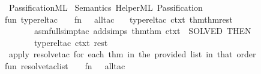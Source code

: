 %
\begin{isabellebody}%
%
%
\isadelimtheory
%
\endisadelimtheory
%
\isatagtheory
{}\isamarkupfalse%
\ PassificationML\isanewline
{}\ Semantics\ HelperML\ Passification\isanewline
{}%
\endisatagtheory
{\isafoldtheory}%
%
\isadelimtheory
\isanewline
%
\endisadelimtheory
\isanewline
%
\isadelimML
\isanewline
%
\endisadelimML
%
\isatagML
{}\isamarkupfalse%
\ {\isacartoucheopen}\isanewline
fun\ type{\isacharunderscore}{\kern0pt}rel{\isacharunderscore}{\kern0pt}tac\ {\isacharunderscore}{\kern0pt}\ {\isacharbrackleft}{\kern0pt}{\isacharbrackright}{\kern0pt}\ {\isacharequal}{\kern0pt}\ {\isacharparenleft}{\kern0pt}fn\ {\isacharunderscore}{\kern0pt}\ {\isacharequal}{\kern0pt}{\isachargreater}{\kern0pt}\ all{\isacharunderscore}{\kern0pt}tac{\isacharparenright}{\kern0pt}\isanewline
\ {\isacharbar}{\kern0pt}\ \ type{\isacharunderscore}{\kern0pt}rel{\isacharunderscore}{\kern0pt}tac\ ctxt\ {\isacharparenleft}{\kern0pt}{\isacharparenleft}{\kern0pt}thm{}{\isacharcomma}{\kern0pt}thm{}{\isacharparenright}{\kern0pt}{\isacharcolon}{\kern0pt}{\isacharcolon}{\kern0pt}rest{\isacharparenright}{\kern0pt}\ {\isacharequal}{\kern0pt}\ \isanewline
\ \ \ \ \ \ \ {\isacharparenleft}{\kern0pt}{\isacharparenleft}{\kern0pt}asm{\isacharunderscore}{\kern0pt}full{\isacharunderscore}{\kern0pt}simp{\isacharunderscore}{\kern0pt}tac\ {\isacharparenleft}{\kern0pt}add{\isacharunderscore}{\kern0pt}simps\ {\isacharbrackleft}{\kern0pt}thm{}{\isacharcomma}{\kern0pt}thm{}{\isacharbrackright}{\kern0pt}\ ctxt{\isacharparenright}{\kern0pt}{\isacharparenright}{\kern0pt}\ {\isacharbar}{\kern0pt}{\isachargreater}{\kern0pt}\ SOLVED{\isacharprime}{\kern0pt}{\isacharparenright}{\kern0pt}\ THEN{\isacharprime}{\kern0pt}\isanewline
\ \ \ \ \ \ \ type{\isacharunderscore}{\kern0pt}rel{\isacharunderscore}{\kern0pt}tac\ ctxt\ rest\isanewline
\isanewline
{\isacharparenleft}{\kern0pt}{\isacharasterisk}{\kern0pt}\ apply\ resolve{\isacharunderscore}{\kern0pt}tac\ for\ each\ thm\ in\ the\ provided\ list\ {\isacharparenleft}{\kern0pt}in\ that\ order{\isacharparenright}{\kern0pt}\ {\isacharasterisk}{\kern0pt}{\isacharparenright}{\kern0pt}\isanewline
fun\ resolve{\isacharunderscore}{\kern0pt}tac{\isacharunderscore}{\kern0pt}list\ {\isacharunderscore}{\kern0pt}\ {\isacharbrackleft}{\kern0pt}{\isacharbrackright}{\kern0pt}\ {\isacharequal}{\kern0pt}\ {\isacharparenleft}{\kern0pt}fn\ {\isacharunderscore}{\kern0pt}\ {\isacharequal}{\kern0pt}{\isachargreater}{\kern0pt}\ all{\isacharunderscore}{\kern0pt}tac{\isacharparenright}{\kern0pt}\isanewline

\end{isabellebody}
